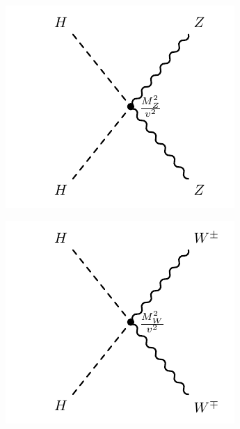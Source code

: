 \begin{figure}[!h]
\begin{subfigure}{0.225\textwidth}
   \includegraphics[width=\textwidth]{figures/h2z2.pdf}
\end{subfigure} %
\begin{subfigure}{0.225\textwidth}
   \includegraphics[width=\textwidth]{figures/h2w2.pdf}
\end{subfigure}%
\begin{subfigure}{0.225\textwidth}

\end{subfigure}
\end{figure}

